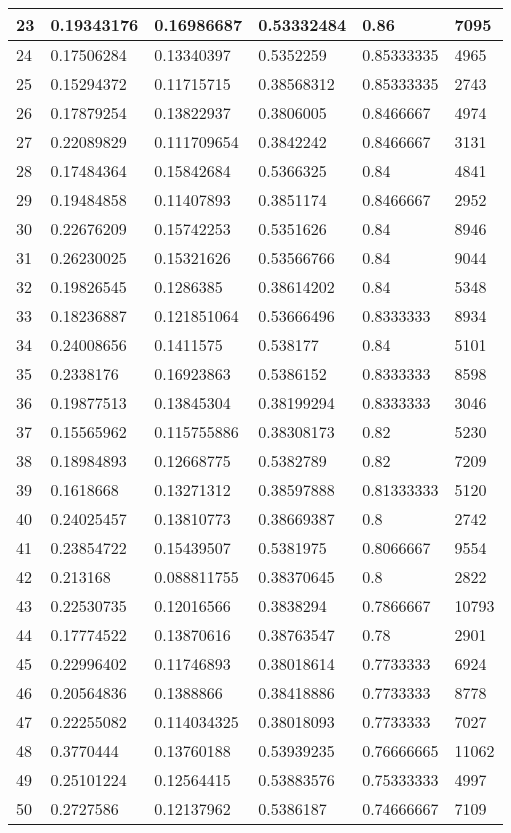 \begin{longtable}{|l|l|l|l|l|l|}
23 & 0.19343176 & 0.16986687 & 0.53332484 & 0.86 & 7095 \\ \hline 
24 & 0.17506284 & 0.13340397 & 0.5352259 & 0.85333335 & 4965 \\ \hline 
25 & 0.15294372 & 0.11715715 & 0.38568312 & 0.85333335 & 2743 \\ \hline 
26 & 0.17879254 & 0.13822937 & 0.3806005 & 0.8466667 & 4974 \\ \hline 
27 & 0.22089829 & 0.111709654 & 0.3842242 & 0.8466667 & 3131 \\ \hline 
28 & 0.17484364 & 0.15842684 & 0.5366325 & 0.84 & 4841 \\ \hline 
29 & 0.19484858 & 0.11407893 & 0.3851174 & 0.8466667 & 2952 \\ \hline 
30 & 0.22676209 & 0.15742253 & 0.5351626 & 0.84 & 8946 \\ \hline 
31 & 0.26230025 & 0.15321626 & 0.53566766 & 0.84 & 9044 \\ \hline 
32 & 0.19826545 & 0.1286385 & 0.38614202 & 0.84 & 5348 \\ \hline 
33 & 0.18236887 & 0.121851064 & 0.53666496 & 0.8333333 & 8934 \\ \hline 
34 & 0.24008656 & 0.1411575 & 0.538177 & 0.84 & 5101 \\ \hline 
35 & 0.2338176 & 0.16923863 & 0.5386152 & 0.8333333 & 8598 \\ \hline 
36 & 0.19877513 & 0.13845304 & 0.38199294 & 0.8333333 & 3046 \\ \hline 
37 & 0.15565962 & 0.115755886 & 0.38308173 & 0.82 & 5230 \\ \hline 
38 & 0.18984893 & 0.12668775 & 0.5382789 & 0.82 & 7209 \\ \hline 
39 & 0.1618668 & 0.13271312 & 0.38597888 & 0.81333333 & 5120 \\ \hline 
40 & 0.24025457 & 0.13810773 & 0.38669387 & 0.8 & 2742 \\ \hline 
41 & 0.23854722 & 0.15439507 & 0.5381975 & 0.8066667 & 9554 \\ \hline 
42 & 0.213168 & 0.088811755 & 0.38370645 & 0.8 & 2822 \\ \hline 
43 & 0.22530735 & 0.12016566 & 0.3838294 & 0.7866667 & 10793 \\ \hline 
44 & 0.17774522 & 0.13870616 & 0.38763547 & 0.78 & 2901 \\ \hline 
45 & 0.22996402 & 0.11746893 & 0.38018614 & 0.7733333 & 6924 \\ \hline 
46 & 0.20564836 & 0.1388866 & 0.38418886 & 0.7733333 & 8778 \\ \hline 
47 & 0.22255082 & 0.114034325 & 0.38018093 & 0.7733333 & 7027 \\ \hline 
48 & 0.3770444 & 0.13760188 & 0.53939235 & 0.76666665 & 11062 \\ \hline 
49 & 0.25101224 & 0.12564415 & 0.53883576 & 0.75333333 & 4997 \\ \hline 
50 & 0.2727586 & 0.12137962 & 0.5386187 & 0.74666667 & 7109 \\ \hline 
\end{longtable}